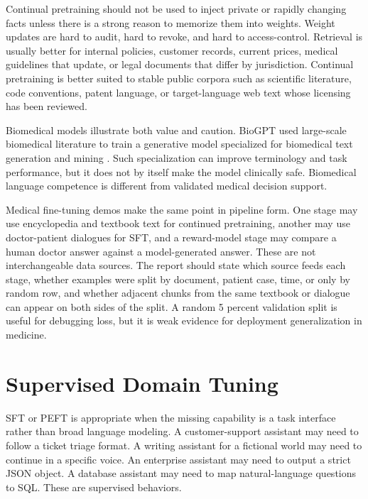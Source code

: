 Continual pretraining should not be used to inject private or rapidly changing facts unless there is a strong reason to memorize them into weights. Weight updates are hard to audit, hard to revoke, and hard to access-control. Retrieval is usually better for internal policies, customer records, current prices, medical guidelines that update, or legal documents that differ by jurisdiction. Continual pretraining is better suited to stable public corpora such as scientific literature, code conventions, patent language, or target-language web text whose licensing has been reviewed.

Biomedical models illustrate both value and caution. BioGPT used large-scale biomedical literature to train a generative model specialized for biomedical text generation and mining \cite{luo2022biogpt}. Such specialization can improve terminology and task performance, but it does not by itself make the model clinically safe. Biomedical language competence is different from validated medical decision support.

Medical fine-tuning demos make the same point in pipeline form. One stage may use encyclopedia and textbook text for continued pretraining, another may use doctor-patient dialogues for SFT, and a reward-model stage may compare a human doctor answer against a model-generated answer. These are not interchangeable data sources. The report should state which source feeds each stage, whether examples were split by document, patient case, time, or only by random row, and whether adjacent chunks from the same textbook or dialogue can appear on both sides of the split. A random 5 percent validation split is useful for debugging loss, but it is weak evidence for deployment generalization in medicine.

\section{Supervised Domain Tuning}
\label{sec:supervised-domain-tuning}

SFT or PEFT is appropriate when the missing capability is a task interface rather than broad language modeling. A customer-support assistant may need to follow a ticket triage format. A writing assistant for a fictional world may need to continue in a specific voice. An enterprise assistant may need to output a strict JSON object. A database assistant may need to map natural-language questions to SQL. These are supervised behaviors.

